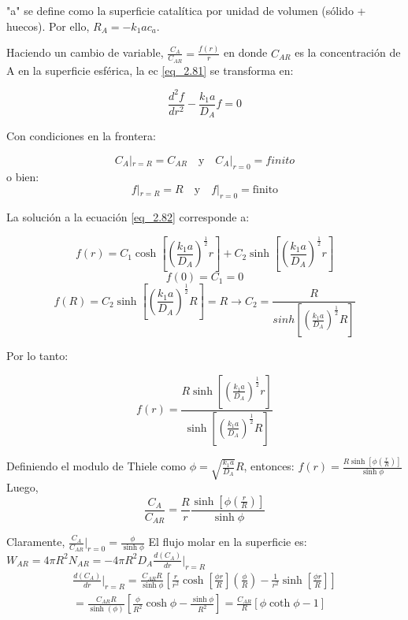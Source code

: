 "a" se define como la superficie catalítica por unidad de volumen (sólido + huecos). Por ello, $R_A=-k_1ac_a$.

Haciendo un cambio de variable, $\frac{C_A}{C_{AR}}=\frac{f(r)}{r}$ en donde $C_{AR}$ es la concentración de A en la superficie esférica, la ec \eqref{eq_2.81} se transforma en:

\begin{equation}
    \frac{d^2f}{dr^2}-\frac{k_1a}{D_A}f=0
    \label{eq_2.82}
\end{equation}

Con condiciones en la frontera:

\begin{equation}
    C_A|_{r=R}=C_{AR} \quad \text{y} \quad C_A|_{r=0}=finito
\end{equation}
o bien:
\begin{equation*}
    f|_{r=R}=R\quad \text{y} \quad
    f|_{r=0}=\text{finito}
\end{equation*}

La solución a la ecuación \eqref{eq_2.82} corresponde a:

\begin{equation}
    f(r)=C_1\cosh[(\frac{k_1a}{D_A})^\frac{1}{2}r]+C_2\sinh[(\frac{k_1a}{D_A})^\frac{1}{2}r]
\end{equation}
\begin{equation*}
    f(0)=C_1=0
\end{equation*}
\begin{equation*}
    f(R)=C_2\sinh[(\frac{k_1a}{D_A})^\frac{1}{2}R]=R\longrightarrow C_2=\frac{R}{sinh[(\frac{k_1a}{D_A})^\frac{1}{2}R]}
\end{equation*}

Por lo tanto:

\begin{equation}
    f(r)=\frac{R\sinh[(\frac{k_1a}{D_A})^\frac{1}{2}r]}{\sinh[(\frac{k_1a}{D_A})^\frac{1}{2}R]}
\end{equation}

Definiendo el modulo de Thiele como $\phi=\sqrt{\frac{k_1a}{D_A}}R$, entonces:
    $f(r)=\frac{R\sinh[\phi(\frac{r}{R})]}{\sinh\phi}$
Luego, 
\begin{equation}
    \frac{C_A}{C_{AR}}=\frac{R}{r}\frac{\sinh[\phi(\frac{r}{R})]}{\sinh\phi}
\end{equation}


Claramente, $\frac{C_A}{C_{AR}}|_{r=0}=\frac{\phi}{\sinh\phi}$ 
\newline
El flujo molar en la superficie es: $W_{AR}=4\pi R^2N_{AR}=-4\pi R^2D_A\frac{d(C_A)}{dr}|_{r=R}$
\begin{equation*}
\begin{split}
        \frac{d(C_A)}{dr}|_{r=R}=\frac{C_{AR}R}{\sinh \phi}\left[\frac{r}{r^2}\cosh\left[\frac{\phi r}{R}\right]\left(\frac{\phi}{R}\right)-\frac{1}{r^2}\sinh \left[\frac{\phi r}{R}\right]\right]\\
=\frac{C_{AR}R}{\sinh (\phi)}\left[\frac{\phi}{R^2}\cosh \phi-\frac{\sinh \phi}{R^2}\right]=\frac{C_{AR}}{R}[\phi \coth \phi-1]
\end{split}
\end{equation*}

